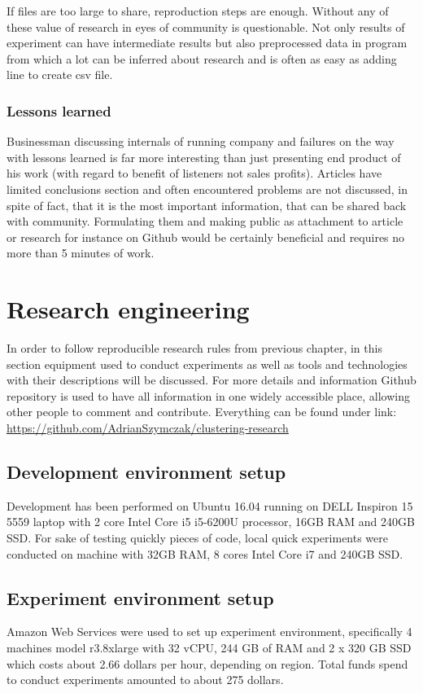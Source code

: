 \documentclass[a4paper, 12pt, oneside]{Thesis} %
\begin{document}
If files are too large to share, reproduction steps are enough. Without any of these value of research in eyes of community is questionable. Not only results of experiment can have intermediate results but also preprocessed data in program from which a lot can be inferred about research and is often as easy as adding line to create csv file.

\subsection{Lessons learned} Businessman discussing internals of running company and failures on the way with lessons learned is far more interesting than just presenting end product of his work (with regard to benefit of listeners not sales profits). Articles have limited conclusions section and often encountered problems are not discussed, in spite of fact, that it is the most important information, that can be shared back with community. Formulating them and making public as attachment to article or research for instance on Github would be certainly beneficial and requires no more than 5 minutes of work.

\chapter{Research engineering} In order to follow reproducible research rules from previous chapter, in this section equipment used to conduct experiments as well as tools and technologies with their descriptions will be discussed. For more details and information Github repository is used to have all information in one widely accessible place, allowing other people to comment and contribute. Everything can be found under link: \url{https://github.com/AdrianSzymczak/clustering-research}

\section{Development environment setup} Development has been performed on Ubuntu 16.04 running on DELL Inspiron 15 5559 laptop with 2 core Intel Core i5 i5-6200U processor, 16GB RAM and 240GB SSD. For sake of testing quickly pieces of code, local quick experiments were conducted on machine with 32GB RAM, 8 cores Intel Core i7 and 240GB SSD.

\section{Experiment environment setup} Amazon Web Services were used to set up experiment environment, specifically 4 machines model r3.8xlarge with 32 vCPU, 244 GB of RAM and 2 x 320 GB SSD which costs about 2.66 dollars per hour, depending on region. Total funds spend to conduct experiments amounted to about 275 dollars. 
\end{document}
